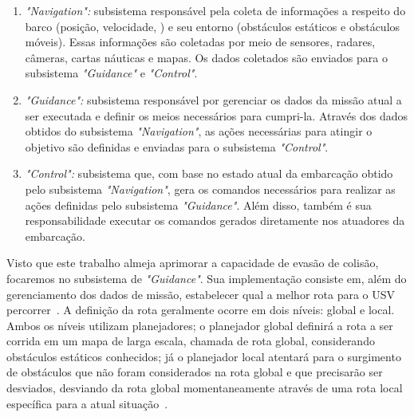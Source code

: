         \begin{enumerate}
            \item \textit{"Navigation":} subsistema responsável pela coleta de informações a respeito do barco (posição, velocidade, \etc) e seu entorno (obstáculos estáticos e obstáculos móveis). Essas informações são coletadas por meio de sensores, radares, câmeras, cartas náuticas e mapas. Os dados coletados são enviados para o subsistema \textit{"Guidance"} e \textit{"Control"}.
            
            \item \textit{"Guidance":} subsistema responsável por gerenciar os dados da missão atual a ser executada e definir os meios necessários para cumpri-la. Através dos dados obtidos do subsistema \textit{"Navigation"}, as ações necessárias para atingir o objetivo são definidas e enviadas para o subsistema \textit{"Control"}.
            
            \item \textit{"Control":} subsistema que, com base no estado atual da embarcação obtido pelo subsistema \textit{"Navigation"}, gera os comandos necessários para realizar as ações definidas pelo subsistema \textit{"Guidance"}. Além disso, também é sua responsabilidade executar os comandos gerados diretamente nos atuadores da embarcação.
        \end{enumerate}
        
        Visto que este trabalho almeja aprimorar a capacidade de evasão de colisão, focaremos no subsistema de \textit{"Guidance"}. Sua implementação consiste em, além do gerenciamento dos dados de missão, estabelecer qual a melhor rota para o USV percorrer~\cite{JURAK2020}. A definição da rota geralmente ocorre em dois níveis: global e local. Ambos os níveis utilizam planejadores; o planejador global definirá a rota a ser corrida em um mapa de larga escala, chamada de rota global, considerando obstáculos estáticos conhecidos; já o planejador local atentará para o surgimento de obstáculos que não foram considerados na rota global e que precisarão ser desviados, desviando da rota global momentaneamente através de uma rota local específica para a atual situação~\cite{LIU201671}.
    

